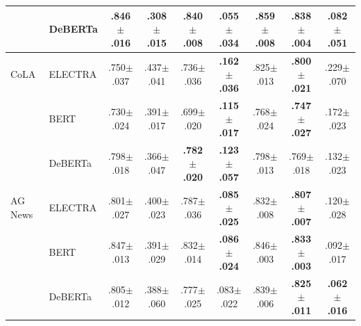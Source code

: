 \begin{table}[t]
\begin{tabular}{@{}ll cccc ccc@{}}
 & DeBERTa & .846{\scriptsize$\pm$.016} & .308{\scriptsize$\pm$.015} & \textbf{.840{\scriptsize$\pm$.008}} & \textbf{.055{\scriptsize$\pm$.034}} & .859{\scriptsize$\pm$.008} & .838{\scriptsize$\pm$.004} & .082{\scriptsize$\pm$.051} \\
\midrule
CoLA & ELECTRA & .750{\scriptsize$\pm$.037} & .437{\scriptsize$\pm$.041} & .736{\scriptsize$\pm$.036} & \textbf{.162{\scriptsize$\pm$.036}} & .825{\scriptsize$\pm$.013} & \textbf{.800{\scriptsize$\pm$.021}} & .229{\scriptsize$\pm$.070} \\
 & BERT & .730{\scriptsize$\pm$.024} & .391{\scriptsize$\pm$.017} & .699{\scriptsize$\pm$.020} & \textbf{.115{\scriptsize$\pm$.017}} & .768{\scriptsize$\pm$.024} & \textbf{.747{\scriptsize$\pm$.027}} & .172{\scriptsize$\pm$.023} \\
 & DeBERTa & .798{\scriptsize$\pm$.018} & .366{\scriptsize$\pm$.047} & \textbf{.782{\scriptsize$\pm$.020}} & \textbf{.123{\scriptsize$\pm$.057}} & .798{\scriptsize$\pm$.013} & .769{\scriptsize$\pm$.018} & .132{\scriptsize$\pm$.023} \\
\midrule
AG News & ELECTRA & .801{\scriptsize$\pm$.027} & .400{\scriptsize$\pm$.023} & .787{\scriptsize$\pm$.036} & \textbf{.085{\scriptsize$\pm$.025}} & .832{\scriptsize$\pm$.008} & \textbf{.807{\scriptsize$\pm$.007}} & .120{\scriptsize$\pm$.028} \\
 & BERT & .847{\scriptsize$\pm$.013} & .391{\scriptsize$\pm$.029} & .832{\scriptsize$\pm$.014} & \textbf{.086{\scriptsize$\pm$.024}} & .846{\scriptsize$\pm$.003} & \textbf{.833{\scriptsize$\pm$.003}} & .092{\scriptsize$\pm$.017} \\
 & DeBERTa & .805{\scriptsize$\pm$.012} & .388{\scriptsize$\pm$.060} & .777{\scriptsize$\pm$.025} & .083{\scriptsize$\pm$.022} & .839{\scriptsize$\pm$.006} & \textbf{.825{\scriptsize$\pm$.011}} & \textbf{.062{\scriptsize$\pm$.016}} \\
\bottomrule
\end{tabular}
\end{table}
